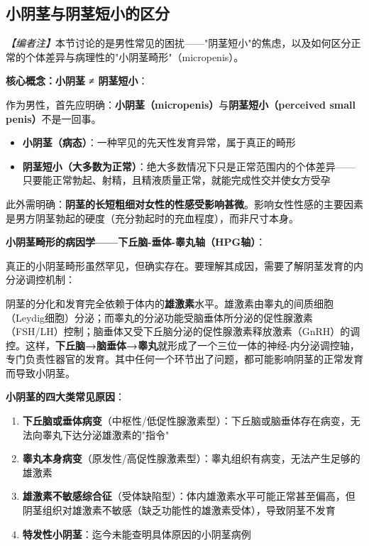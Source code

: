 \subsection{小阴茎与阴茎短小的区分}

\noindent\textit{【编者注】}本节讨论的是男性常见的困扰——"阴茎短小"的焦虑，以及如何区分正常的个体差异与病理性的"小阴茎畸形"（micropenis）。

\vspace{0.5em}
\noindent\textbf{核心概念：小阴茎 ≠ 阴茎短小}：

作为男性，首先应明确：\textbf{小阴茎（micropenis）}与\textbf{阴茎短小（perceived small penis）}不是一回事。

\begin{itemize}
	\item \textbf{小阴茎（病态）}：一种罕见的先天性发育异常，属于真正的畸形
	\item \textbf{阴茎短小（大多数为正常）}：绝大多数情况下只是正常范围内的个体差异——只要能正常勃起、射精，且精液质量正常，就能完成性交并使女方受孕
\end{itemize}

此外需明确：\textbf{阴茎的长短粗细对女性的性感受影响甚微}。影响女性性感的主要因素是男方阴茎勃起的硬度（充分勃起时的充血程度），而非尺寸本身。

\vspace{0.5em}
\noindent\textbf{小阴茎畸形的病因学——下丘脑-垂体-睾丸轴（HPG轴）}：

真正的小阴茎畸形虽然罕见，但确实存在。要理解其成因，需要了解阴茎发育的内分泌调控机制：

阴茎的分化和发育完全依赖于体内的\textbf{雄激素}水平。雄激素由睾丸的间质细胞（Leydig细胞）分泌；而睾丸的分泌功能受脑垂体所分泌的促性腺激素（FSH/LH）控制；脑垂体又受下丘脑分泌的促性腺激素释放激素（GnRH）的调控。这样，\textbf{下丘脑→脑垂体→睾丸}就形成了一个三位一体的神经-内分泌调控轴，专门负责性器官的发育。其中任何一个环节出了问题，都可能影响阴茎的正常发育而导致小阴茎。

\vspace{0.5em}
\noindent\textbf{小阴茎的四大类常见原因}：

\begin{enumerate}
	\item \textbf{下丘脑或垂体病变}（中枢性/低促性腺激素型）：下丘脑或脑垂体存在病变，无法向睾丸下达分泌雄激素的"指令"
	\item \textbf{睾丸本身病变}（原发性/高促性腺激素型）：睾丸组织有病变，无法产生足够的雄激素
	\item \textbf{雄激素不敏感综合征}（受体缺陷型）：体内雄激素水平可能正常甚至偏高，但阴茎组织对雄激素不敏感（缺乏功能性的雄激素受体），导致阴茎不发育
	\item \textbf{特发性小阴茎}：迄今未能查明具体原因的小阴茎病例
\end{enumerate}

